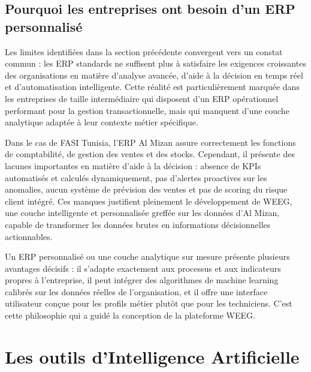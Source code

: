 \documentclass[a4paper,12pt]{report}
\begin{document}
\subsection{Pourquoi les entreprises ont besoin d'un ERP personnalisé}

Les limites identifiées dans la section précédente convergent vers un constat
commun : les ERP standards ne suffisent plus à satisfaire les exigences
croissantes des organisations en matière d'analyse avancée, d'aide à la décision
en temps réel et d'automatisation intelligente. Cette réalité est particulièrement
marquée dans les entreprises de taille intermédiaire qui disposent d'un ERP
opérationnel performant pour la gestion transactionnelle, mais qui manquent d'une
couche analytique adaptée à leur contexte métier spécifique.

Dans le cas de FASI Tunisia, l'ERP Al Mizan assure correctement les fonctions de
comptabilité, de gestion des ventes et des stocks. Cependant, il présente des
lacunes importantes en matière d'aide à la décision : absence de KPIs automatisés
et calculés dynamiquement, pas d'alertes proactives sur les anomalies, aucun
système de prévision des ventes et pas de scoring du risque client intégré. Ces
manques justifient pleinement le développement de WEEG, une couche intelligente
et personnalisée greffée sur les données d'Al Mizan, capable de transformer les
données brutes en informations décisionnelles actionnables.

Un ERP personnalisé ou une couche analytique sur mesure présente plusieurs
avantages décisifs : il s'adapte exactement aux processus et aux indicateurs
propres à l'entreprise, il peut intégrer des algorithmes de machine learning
calibrés sur les données réelles de l'organisation, et il offre une interface
utilisateur conçue pour les profils métier plutôt que pour les techniciens. C'est
cette philosophie qui a guidé la conception de la plateforme WEEG.


\section{Les outils d'Intelligence Artificielle}
\end{document}
